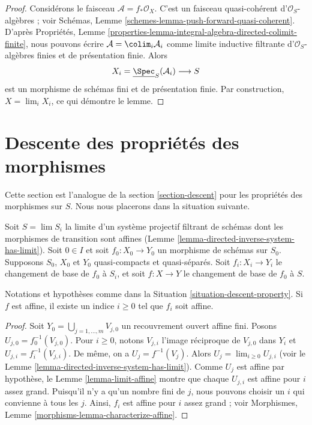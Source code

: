 \begin{proof}
Considérons le faisceau $\mathcal{A} = f_*\mathcal{O}_X$. C'est un faisceau
quasi-cohérent d'$\mathcal{O}_S$-algèbres ; voir Schémas,
Lemme \ref{schemes-lemma-push-forward-quasi-coherent}. D'après
Propriétés,
Lemme \ref{properties-lemma-integral-algebra-directed-colimit-finite}, nous
pouvons écrire $\mathcal{A} = \colim_i \mathcal{A}_i$ comme limite inductive
filtrante d'$\mathcal{O}_S$-algèbres finies et de présentation finie. Alors
$$
X_i = \underline{\Spec}_S(\mathcal{A}_i)
\longrightarrow
S
$$
est un morphisme de schémas fini et de présentation finie. Par construction,
$X = \lim_i X_i$, ce qui démontre le lemme.
\end{proof}








\section{Descente des propriétés des morphismes}
\label{section-descent-of-properties}

\noindent
Cette section est l'analogue de la section \ref{section-descent} pour les
propriétés des morphismes sur $S$. Nous nous placerons dans la situation
suivante.

\begin{situation}
\label{situation-descent-property}
Soit $S = \lim S_i$ la limite d'un système projectif filtrant de schémas dont les
morphismes de transition sont affines
(Lemme \ref{lemma-directed-inverse-system-has-limit}). Soit $0 \in I$ et soit
$f_0 : X_0 \to Y_0$ un morphisme de schémas sur $S_0$. Supposons $S_0$,
$X_0$ et $Y_0$ quasi-compacts et quasi-séparés. Soit
$f_i : X_i \to Y_i$ le changement de base de $f_0$ à $S_i$, et soit
$f : X \to Y$ le changement de base de $f_0$ à $S$.
\end{situation}

\begin{lemma}
\label{lemma-descend-affine-finite-presentation}
Notations et hypothèses comme dans la
Situation \ref{situation-descent-property}. Si $f$ est affine, il existe un
indice $i \geq 0$ tel que $f_i$ soit affine.
\end{lemma}

\begin{proof}
Soit $Y_0 = \bigcup_{j = 1, \ldots, m} V_{j, 0}$ un recouvrement ouvert
affine fini. Posons $U_{j, 0} = f_0^{-1}(V_{j, 0})$. Pour $i \geq 0$, notons
$V_{j, i}$ l'image réciproque de $V_{j, 0}$ dans $Y_i$ et
$U_{j, i} = f_i^{-1}(V_{j, i})$. De même, on a $U_j = f^{-1}(V_j)$. Alors
$U_j = \lim_{i \geq 0} U_{j, i}$ (voir le
Lemme \ref{lemma-directed-inverse-system-has-limit}). Comme $U_j$ est affine
par hypothèse, le Lemme \ref{lemma-limit-affine} montre que chaque $U_{j, i}$
est affine pour $i$ assez grand. Puisqu'il n'y a qu'un nombre fini de $j$,
nous pouvons choisir un $i$ qui convienne à tous les $j$. Ainsi, $f_i$ est affine
pour $i$ assez grand ; voir Morphismes,
Lemme \ref{morphisms-lemma-characterize-affine}.
\end{proof}


